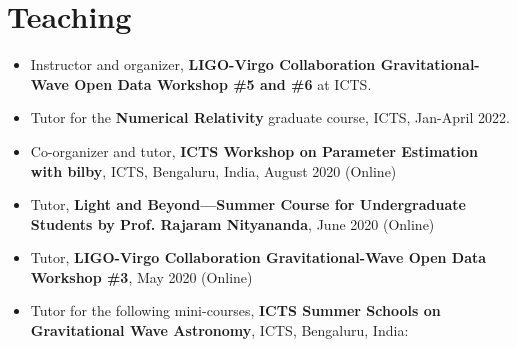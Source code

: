 		\section{Teaching}
		
		\begin{itemize}[leftmargin=*]
		
			\item Instructor and organizer, \textbf{LIGO-Virgo Collaboration Gravitational-Wave Open Data Workshop \#5 and \#6} at ICTS.
			\item Tutor for the \textbf{Numerical Relativity} graduate course, ICTS, Jan-April 2022.
			\item Co-organizer and tutor, \textbf{ICTS Workshop on Parameter Estimation with bilby}, ICTS, Bengaluru, India, August 2020 (Online)
			\item Tutor, \textbf{Light and Beyond---Summer Course for Undergraduate Students by Prof. Rajaram Nityananda}, June 2020 (Online)
			\item Tutor, \textbf{LIGO-Virgo Collaboration Gravitational-Wave Open Data Workshop \#3}, May 2020 (Online)
			\item Tutor for the following mini-courses, \textbf{ICTS Summer Schools on Gravitational Wave Astronomy}, ICTS, Bengaluru, India:

			
		\end{itemize}
		
		


